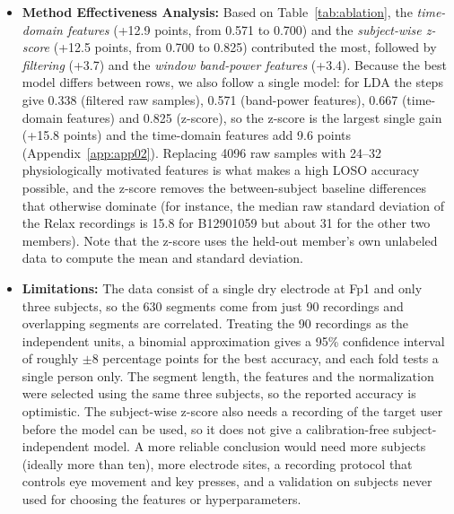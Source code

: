 \begin{itemize}[leftmargin=*]
    \item \textbf{Method Effectiveness Analysis:} Based on Table~\ref{tab:ablation}, the \emph{time-domain features} (+12.9 points, from 0.571 to 0.700) and the \emph{subject-wise z-score} (+12.5 points, from 0.700 to 0.825) contributed the most, followed by \emph{filtering} (+3.7) and the \emph{window band-power features} (+3.4). Because the best model differs between rows, we also follow a single model: for LDA the steps give 0.338 (filtered raw samples), 0.571 (band-power features), 0.667 (time-domain features) and 0.825 (z-score), so the z-score is the largest single gain (+15.8 points) and the time-domain features add 9.6 points (Appendix~\ref{app:app02}). Replacing 4096 raw samples with 24--32 physiologically motivated features is what makes a high LOSO accuracy possible, and the z-score removes the between-subject baseline differences that otherwise dominate (for instance, the median raw standard deviation of the Relax recordings is 15.8 for B12901059 but about 31 for the other two members). Note that the z-score uses the held-out member's own unlabeled data to compute the mean and standard deviation.
    \item \textbf{Limitations:} The data consist of a single dry electrode at Fp1 and only three subjects, so the 630 segments come from just 90 recordings and overlapping segments are correlated. Treating the 90 recordings as the independent units, a binomial approximation gives a 95\% confidence interval of roughly $\pm$8 percentage points for the best accuracy, and each fold tests a single person only. The segment length, the features and the normalization were selected using the same three subjects, so the reported accuracy is optimistic. The subject-wise z-score also needs a recording of the target user before the model can be used, so it does not give a calibration-free subject-independent model. A more reliable conclusion would need more subjects (ideally more than ten), more electrode sites, a recording protocol that controls eye movement and key presses, and a validation on subjects never used for choosing the features or hyperparameters.
\end{itemize}

